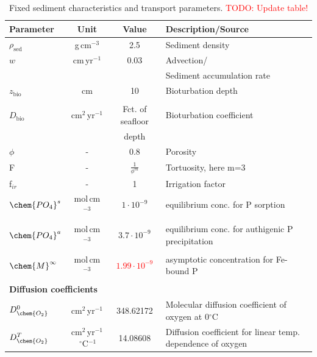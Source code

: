 \documentclass[gmd, manuscript]{copernicus}
\begin{document}
\begin{table}[hbtp]
\caption{Fixed sediment characteristics and transport parameters. \textcolor{red}{TODO: Update table!}}
\centering
\begin{tabular}{l c c l}
\hline\hline
Parameter & Unit  & Value & Description/Source\\
\hline
$\rho_{\mathrm{sed}}$ & g\,cm$^{-3}$ & 2.5 & Sediment density \\
$w$ & cm\,yr$^{-1}$ & 0.03 & Advection/\\
&&& Sediment accumulation rate \\
$z_{\mathrm{bio}}$& cm & 10 & Bioturbation depth\\
&&&\citet{boudreau_mean_1998, teal_global_2010}\\
$D_{\mathrm{bio}}$& cm$^2$\,yr$^{-1}$ & Fct. of seafloor & Bioturbation coefficient\\
&& depth &\citet{middelburg_empirical_1997}\\
$\phi$ & - & 0.8 & Porosity\\
F & - &  $\frac{1}{\phi^m}$ & Tortuosity, here m=3\\
f$_{ir}$ & - & 1 & Irrigation factor\\
$\chem{PO_4}^s$ & mol\,cm$^{-3}$ & $1\cdot 10^{-9}$ & equilibrium conc. for P sorption\\
&&&\citet{caroline_p_slomp_key_1996}\\
$\chem{PO_4}^a$ & mol\,cm$^{-3}$ & $3.7\cdot 10^{-9}$ & equilibrium conc. for authigenic P precipitation\\
&&&\citet{caroline_p_slomp_key_1996}\\
$\chem{M}^\infty$ & mol\,cm$^{-3}$ & \textcolor{red}{$1.99\cdot 10^{-9}$} & asymptotic concentration for Fe-bound P\\
&&&\citet{caroline_p_slomp_key_1996}\\
\multicolumn{4}{l}{\textbf{Diffusion coefficients} \citep{Li_diffusion_1974, gypens_simple_2008}}\\
$D_{\chem{O_2}}^0$ & cm$^2$\,yr$^{-1}$ & 348.62172 &Molecular diffusion coefficient of oxygen at 0$^\circ$C\\
$D_{\chem{O_2}}^T$ & cm$^2$\,yr$^{-1}$\,${}^{\circ}$C$^{-1}$ & 14.08608 &Diffusion coefficient for linear temp. dependence of oxygen\\ %

\end{tabular}
\end{table}
\end{document}
